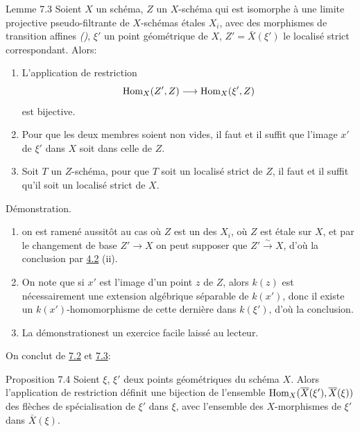 \documentclass[10pt]{../fichiers-configuration-latex/smfart}
\begin{document}
\begin{enonce*}{Lemme 7.3}
Soient $X$ un schéma, $Z$ un $X$-schéma qui est isomorphe à une
limite projective pseudo-filtrante de $X$-schémas étales $X_{i}$,
avec des morphismes de transition affines
\emph{()}, $\xi'$ un point géométrique de $X$,
$Z' = \bar{X} (\xi')$ le localisé strict correspondant. Alors:
\begin{enumerate}
\renewcommand{\theenumi}{\alph{enumi}}
\renewcommand{\labelenumi}{\theenumi)}
\item L'application de restriction
$$
\Hom_X (Z', Z) \to \Hom_X(\xi', Z)
$$
est bijective.

\item Pour que les deux membres soient non vides, il faut et il suffit
  que l'image $x'$ de $\xi'$ dans $X$ soit dans celle de $Z$.

\item Soit $T$ un $Z$-schéma, pour que $T$ soit un localisé strict de
  $Z$, il faut et il suffit qu'il soit un localisé strict de $X$.
\end{enumerate}
\end{enonce*}

Démonstration.
\begin{enumerate}
\renewcommand{\theenumi}{\alph{enumi}}
\renewcommand{\labelenumi}{\theenumi)}
\item on est ramené aussitôt au cas où $Z$ est un des $X_i$, \ie où
  $Z$ est étale sur $X$, et par le changement de base $Z'\to X$ on
  peut supposer que $Z'\xrightarrow{\sim} X$, d'où la conclusion par
  \hyperref[VIII.def4.2]{4.2} (ii).

\item On note que si $x'$ est l'image d'un point $z$ de $Z$, alors
  $k(z)$ est nécessairement une extension algébrique séparable de
  $k(x')$, donc il existe un $k(x')$-homomorphisme de cette dernière
  dans $k(\xi')$, d'où la conclusion.

\item La démonstration\pageoriginale est un exercice facile
  laissé au lecteur.
\end{enumerate}

On conclut de \hyperref[VIII.def7.2]{7.2} et \hyperref[VIII.lem7.3]{7.3}:

\begin{enonce*}{Proposition 7.4}
Soient $\xi$, $\xi'$ deux points géométriques du schéma $X$. Alors
l'application de restriction définit une bijection de l'ensemble
$\operatorname{Hom}_{X} (\overline{X}(\xi'), \overline{X}(\xi))$ des flèches de spécialisation
de $\xi'$ dans $\xi$, avec l'ensemble des $X$-morphismes de $\xi'$
dans $\bar{X}(\xi)$.
\end{enonce*}
\end{document}
